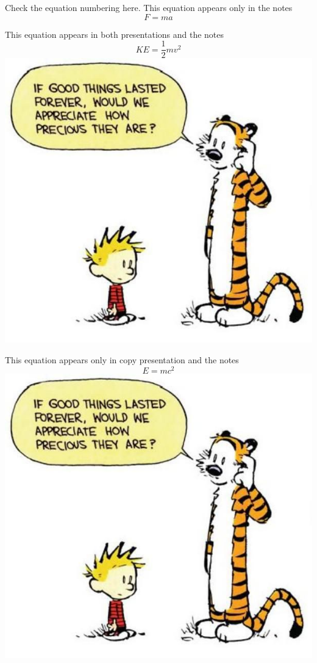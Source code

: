 Check the equation numbering here. This equation appears only in the notes
\begin{equation}
F = ma\label{eq:fma}
\end{equation}
\begin{frame}[label=both]
This equation appears in both presentations and the notes
	\begin{equation}
KE = \frac{1}{2}mv^2\label{eq:ke}
\end{equation}
\includegraphics[scale=0.3]{ch}
\end{frame}
\begin{frame}[label=copy]
This equation appears only in copy presentation and the notes
	\begin{equation}
E = mc^2\label{eq:emc2}
\end{equation}
\includegraphics[scale=0.5]{ch}
\end{frame}
